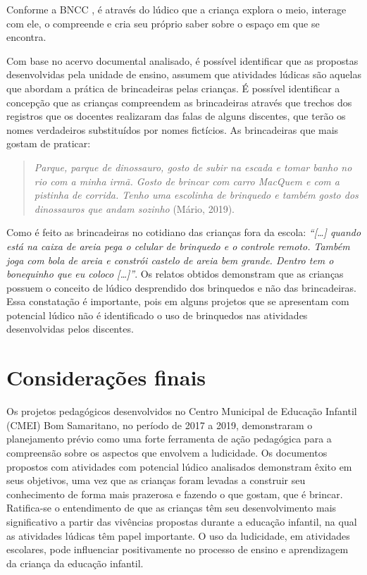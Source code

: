 \begin{refsection}
    Conforme a BNCC \cite{BaNacCurEF2017}, é através do lúdico que a criança explora o meio, interage com ele, o compreende e cria seu próprio saber sobre o espaço em que se encontra. 

    Com base no acervo documental analisado, é possível identificar que as propostas desenvolvidas pela unidade de ensino, assumem que atividades lúdicas são aquelas que abordam a prática de brincadeiras pelas crianças. É possível identificar a concepção que as crianças compreendem as brincadeiras através que trechos dos registros que os docentes realizaram das falas de alguns discentes, que terão os nomes verdadeiros substituídos por nomes fictícios. As brincadeiras que mais gostam de praticar: 

    \begin{quotation}
        \textit{Parque, parque de dinossauro, gosto de subir na escada e tomar banho no rio com a minha irmã. Gosto de brincar com carro MacQuem e com a pistinha de corrida. Tenho uma escolinha de brinquedo e também gosto dos dinossauros que andam sozinho} (Mário, 2019).  
    \end{quotation}

    Como é feito as brincadeiras no cotidiano das crianças fora da escola: \textit{“[\dots] quando está na caixa de areia pega o celular de brinquedo e o controle remoto. Também joga com bola de areia e constrói castelo de areia bem grande. Dentro tem o bonequinho que eu coloco [\dots]”}. Os relatos obtidos demonstram que as crianças possuem o conceito de lúdico desprendido dos brinquedos e não das brincadeiras. Essa constatação é importante, pois em alguns projetos que se apresentam com potencial lúdico não é identificado o uso de brinquedos nas atividades desenvolvidas pelos discentes. 


    \section{Considerações finais}

    Os projetos pedagógicos desenvolvidos no Centro Municipal de Educação Infantil (CMEI) Bom Samaritano, no período de 2017 a 2019, demonstraram o planejamento prévio como uma forte ferramenta de ação pedagógica para a compreensão sobre os aspectos que envolvem a ludicidade. Os documentos propostos com atividades com potencial lúdico analisados demonstram êxito em seus objetivos, uma vez que as crianças foram levadas a construir seu conhecimento de forma mais prazerosa e fazendo o que gostam, que é brincar. Ratifica-se o entendimento de que as crianças têm seu desenvolvimento mais significativo a partir das vivências propostas durante a educação infantil, na qual as atividades lúdicas têm papel importante. O uso da ludicidade, em atividades escolares, pode influenciar positivamente no processo de ensino e aprendizagem da criança da educação infantil.

    \nocite{LDB1996}
    \nocite{RIBEIRO2010afetividade}

    \printbibliography[heading=subbibliography,notcategory=fullcited]

    \label{chap:influencia-ludicoend}

\end{refsection}
